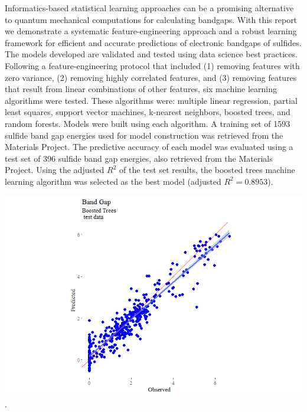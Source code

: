 \documentclass[10pt, letter]{report}
\renewcommand{\=}{\, =\, }
\newcommand{\+}{\, +\, }
\renewcommand{\-}{\, -\, }
\begin{document}
\begin{multicols}{2}
Informatics-based statistical learning approaches can be a promising alternative to quantum mechanical computations for calculating bandgaps. With this report we demonstrate a systematic feature-engineering approach and a robust learning framework for efficient and accurate predictions of electronic bandgaps of sulfides. The models developed are validated and tested using data science best practices. Following a feature-engineering protocol that included (1) removing features with zero variance, (2) removing highly correlated features, and (3) removing features that result from linear combinations of other features, six machine learning algorithms were tested. These algorithms were: multiple linear regression, partial least squares, support vector machines, k-nearest neighbors, boosted trees, and random forests. Models were built using each algorithm. A training set of 1593 sulfide band gap energies used for model construction was retrieved from the Materials Project. The predictive accuracy of each model was evaluated using a test set of 396 sulfide band gap energies, also retrieved from the Materials Project. Using the adjusted \( R^2 \) of the test set results, the boosted trees machine learning algorithm was selected as the best model (adjusted \( R^2 = 0.8953 \)).

\begin{center}
\includegraphics[scale = 0.375]{BoostedTreesTestDataFit.png}
.
\end{center}

\end{multicols}
\end{document}
